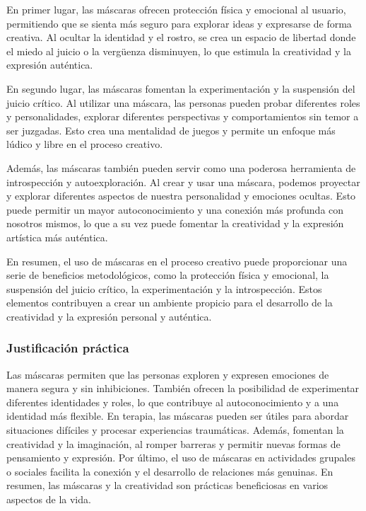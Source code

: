 \documentclass[12pt,a4paper]{article}
\begin{document}
En primer lugar, las máscaras ofrecen protección física y emocional al usuario, permitiendo que se sienta más seguro para explorar ideas y expresarse de forma creativa. Al ocultar la identidad y el rostro, se crea un espacio de libertad donde el miedo al juicio o la vergüenza disminuyen, lo que estimula la creatividad y la expresión auténtica.

En segundo lugar, las máscaras fomentan la experimentación y la suspensión del juicio crítico. Al utilizar una máscara, las personas pueden probar diferentes roles y personalidades, explorar diferentes perspectivas y comportamientos sin temor a ser juzgadas. Esto crea una mentalidad de juegos y permite un enfoque más lúdico y libre en el proceso creativo.

Además, las máscaras también pueden servir como una poderosa herramienta de introspección y autoexploración. Al crear y usar una máscara, podemos proyectar y explorar diferentes aspectos de nuestra personalidad y emociones ocultas. Esto puede permitir un mayor autoconocimiento y una conexión más profunda con nosotros mismos, lo que a su vez puede fomentar la creatividad y la expresión artística más auténtica.

En resumen, el uso de máscaras en el proceso creativo puede proporcionar una serie de beneficios metodológicos, como la protección física y emocional, la suspensión del juicio crítico, la experimentación y la introspección. Estos elementos contribuyen a crear un ambiente propicio para el desarrollo de la creatividad y la expresión personal y auténtica.

\subsubsection{Justificación práctica}
Las máscaras permiten que las personas exploren y expresen emociones de manera segura y sin inhibiciones. También ofrecen la posibilidad de experimentar diferentes identidades y roles, lo que contribuye al autoconocimiento y a una identidad más flexible. En terapia, las máscaras pueden ser útiles para abordar situaciones difíciles y procesar experiencias traumáticas. Además, fomentan la creatividad y la imaginación, al romper barreras y permitir nuevas formas de pensamiento y expresión. Por último, el uso de máscaras en actividades grupales o sociales facilita la conexión y el desarrollo de relaciones más genuinas. En resumen, las máscaras y la creatividad son prácticas beneficiosas en varios aspectos de la vida.
\end{document}
